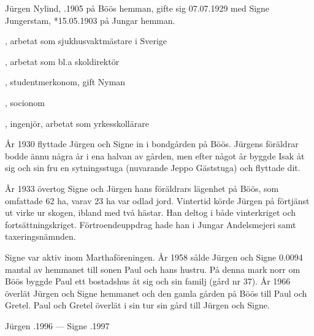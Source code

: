 %
Jürgen Nylind, .1905 på Böös hemman, gifte sig 07.07.1929 med Signe Jungerstam, *15.05.1903 på Jungar hemman.
\begin{jhchildren}
  \item {}
  \item {}, arbetat som sjukhusvaktmästare i Sverige
  \item {}, arbetat som bl.a skoldirektör
  \item {}, studentmerkonom, gift Nyman
  \item {}, socionom
  \item {}, ingenjör, arbetat som yrkesskollärare
\end{jhchildren}
År 1930 flyttade Jürgen och Signe in i bondgården på Böös. Jürgens föräldrar bodde ännu några år i ena halvan av gården, men efter något år byggde Isak åt sig och sin fru en sytningsstuga (nuvarande Jeppo Gäststuga) och flyttade dit.

År 1933 övertog Signe och Jürgen hans föräldrars lägenhet på Böös, som omfattade 62 ha, varav 23 ha var odlad jord. Vintertid körde Jürgen på förtjänst ut virke ur skogen, ibland med två hästar. Han deltog i både vinterkriget och fortsättningskriget. Förtroendeuppdrag hade han i Jungar Andelsmejeri samt taxeringsnämnden.

Signe var aktiv inom Marthaföreningen. År 1958 sålde Jürgen och Signe 0.0094 mantal av hemmanet till sonen Paul och hans hustru. På denna mark norr om Böös byggde Paul  ett bostadshus åt sig och sin familj (gård nr 37). År 1966 överlät Jürgen och Signe hemmanet och den gamla gården på Böös till Paul och Gretel. Paul och Gretel  överlät i sin tur sin gård till Jürgen och Signe.

Jürgen .1996  ---  Signe .1997


